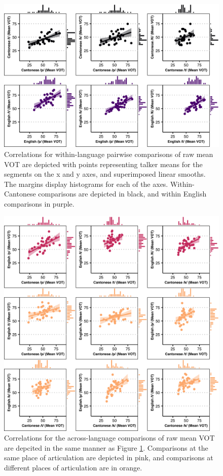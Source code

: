 \begin{figure}[htbp]
  \begin{center}
  \includegraphics[width=0.9\linewidth]{figures/ch4_correlations1_5in.png} 
  \caption{Correlations for within-language pairwise comparisons of raw mean VOT are depicted with points representing talker means for the segments on the x and y axes, and superimposed linear smooths. The margins display histograms for each of the axes. Within-Cantonese comparisons are depicted in black, and within English comparisons in purple.}
  \label{ch4:fig:correlations1}
  \end{center}
\end{figure}

\begin{figure}[htbp]
  \begin{center}
  \includegraphics[width=0.9\linewidth]{figures/ch4_correlations2_5in.png} 
  \caption{Correlations for the across-language comparisons of raw mean VOT are depcited in the same manner as Figure \ref{ch4:fig:correlations1}. Comparisons at the same place of articulation are depicted in pink, and comparisons at different places of articulation are in orange.} 
  \label{ch4:fig:correlations2}
  \end{center}
\end{figure}

